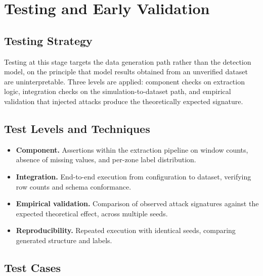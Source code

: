 \chapter{Testing and Early Validation}
\label{ch:testing}

\section{Testing Strategy}
\label{sec:testing-strategy}
Testing at this stage targets the data generation path rather than the detection
model, on the principle that model results obtained from an unverified dataset are
uninterpretable. Three levels are applied: component checks on extraction logic,
integration checks on the simulation-to-dataset path, and empirical validation that
injected attacks produce the theoretically expected signature.

\section{Test Levels and Techniques}
\label{sec:testing-levels}
\begin{itemize}
  \item \textbf{Component.} Assertions within the extraction pipeline on window
        counts, absence of missing values, and per-zone label distribution.
  \item \textbf{Integration.} End-to-end execution from configuration to dataset,
        verifying row counts and schema conformance.
  \item \textbf{Empirical validation.} Comparison of observed attack signatures
        against the expected theoretical effect, across multiple seeds.
  \item \textbf{Reproducibility.} Repeated execution with identical seeds, comparing
        generated structure and labels.
\end{itemize}

\section{Test Cases}
\label{sec:test-cases}

